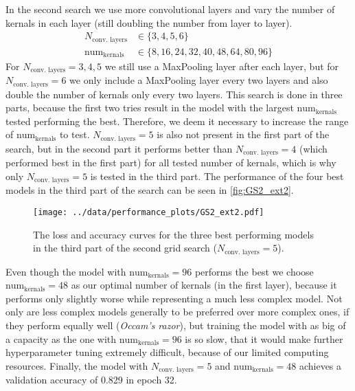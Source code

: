 In the second search we use more convolutional layers and vary the number of kernals in each layer (still doubling the number from layer to layer).
\begin{align}
    N_\text{conv. layers} &\in \{3, 4, 5, 6\} \\
    \text{num}_\text{kernals} &\in \{8, 16, 24, 32, 40, 48, 64, 80, 96\}
\end{align}
For $N_\text{conv. layers} = 3, 4, 5$ we still use a MaxPooling layer after each layer, but for $N_\text{conv. layers} = 6$ we only include a MaxPooling layer every two layers and 
also double the number of kernals only every two layers.
This search is done in three parts, because the first two tries result in the model with the largest $\text{num}_\text{kernals}$ tested performing the best.
Therefore, we deem it necessary to increase the range of $\text{num}_\text{kernals}$ to test.
$N_\text{conv. layers} = 5$ is also not present in the first part of the search, but in the second part it performs better than $N_\text{conv. layers} = 4$ (which performed best in the first part)
for all tested number of kernals, which is why only $N_\text{conv. layers} = 5$ is tested in the third part.
The performance of the four best models in the third part of the search can be seen in \autoref{fig:GS2_ext2}.
\begin{figure}
    \centering
    \texttt{[image: ../data/performance\_plots/GS2\_ext2.pdf]}
    \caption{The loss and accuracy curves for the three best performing models in the third part of the second grid search ($N_\text{conv. layers} = 5$).}
    \label{fig:GS2_ext2}
\end{figure}
Even though the model with $\text{num}_\text{kernals} = 96$ performs the best we choose $\text{num}_\text{kernals} = 48$ as our optimal number of kernals (in the first layer),
because it performs only slightly worse while representing a much less complex model. 
Not only are less complex models generally to be preferred over more complex ones, if they perform equally well (\textit{Occam's razor}), but training the model with as big of a capacity as the one 
with $\text{num}_\text{kernals} = 96$ is so slow, that it would make further hyperparameter tuning extremely difficult, because of our limited computing resources.
Finally, the model with $N_\text{conv. layers} = 5$ and $\text{num}_\text{kernals} = 48$ achieves a validation accuracy of 0.829 in epoch 32.

